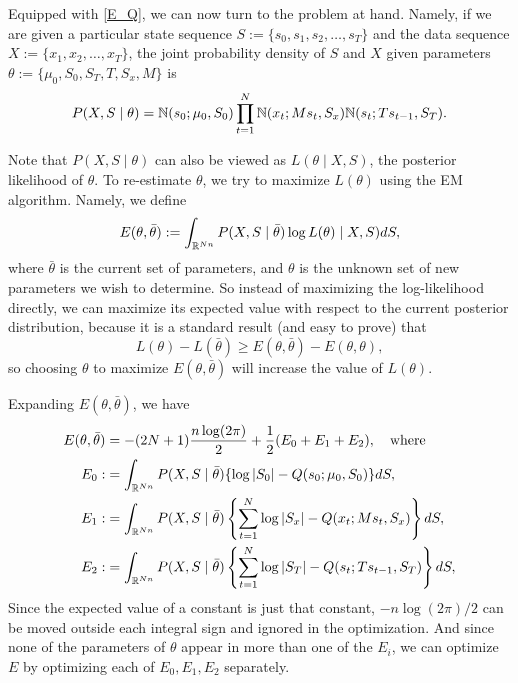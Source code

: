 \documentclass[12pt,leqno]{article}
\begin{document}
Equipped with \eqref{E_Q}, we can now turn to the problem at hand.  Namely, if we are given a particular
state sequence $S := \{s_0,s_1,s_2,\dots,s_T\}$ and the data sequence $X := \{x_1,x_2,\dots,x_T\}$,
the joint probability density of $S$ and $X$ given parameters $\theta := \{\mu_0,S_0,S_T,T,S_x,M\}$ is
$$
P(X,S\mid\theta) = {\mathbb N}(s_0;\mu_0,S_0)\prod_{t=1}^N{\mathbb N}(x_t;Ms_t,S_x){\mathbb N}(s_t;Ts_{t-1},S_T).
$$

Note that $P(X,S\mid\theta)$ can also be viewed as  $L(\theta\mid X,S)$, the posterior likelihood of $\theta$.
To re-estimate $\theta$, we try to maximize $L(\theta)$ using the EM algorithm. Namely, we define 
$$
E(\theta,\bar{\theta}) := \int_{{\mathbb R}^{Nn}}P(X,S\mid\bar{\theta})\log{L(\theta)\mid X,S)}dS,
$$
where $\bar{\theta}$ is the current set of parameters, and $\theta$ is the unknown set of new parameters
we wish to determine. So instead of maximizing the log-likelihood directly, we can maximize its expected
value with respect to the current posterior distribution, because it is a standard result \cite{Dempster}
(and easy to prove) that
$$
L(\theta) - L(\bar{\theta}) \ge E(\theta,\bar{\theta}) - E(\theta,\theta),
$$
so choosing $\theta$ to maximize $E(\theta,\bar{\theta})$ will increase the value of $L(\theta)$.


  
Expanding $E(\theta,\bar{\theta})$, we have 
\begin{align}
  E(\theta,\bar{\theta}) &= -(2N+1)\frac{n\log(2\pi)}{2} + \frac{1}{2}(E_0 + E_1 + E_2),\quad\text{where}\notag\\
  E_0 :&=\int_{{\mathbb R}^{Nn}}P(X,S\mid\bar{\theta})\{\log|S_0| - Q(s_0;\mu_0,S_0)\}dS,\label{E0}\\
  E_1 :&= \int_{{\mathbb R}^{Nn}}P(X,S\mid\bar{\theta})\left\{\sum_{t=1}^N\log|S_x| - Q(x_t;Ms_t,S_x)\right\}dS,
\label{E1}\\
E_2 :&= \int_{{\mathbb R}^{Nn}}P(X,S\mid\bar{\theta})\left\{\sum_{t=1}^N\log|S_T| - Q(s_t;Ts_{t-1},S_T)\right\}dS,
\label{E2}
\end{align}
Since the expected value of a constant is just that constant, $-n\log(2\pi)/2$ can be moved outside each
integral sign and ignored in the optimization.  And since none of the parameters of $\theta$ appear in more
than one of the $E_i$, we can optimize $E$ by optimizing each of $E_0,E_1,E_2$ separately.
\end{document}
